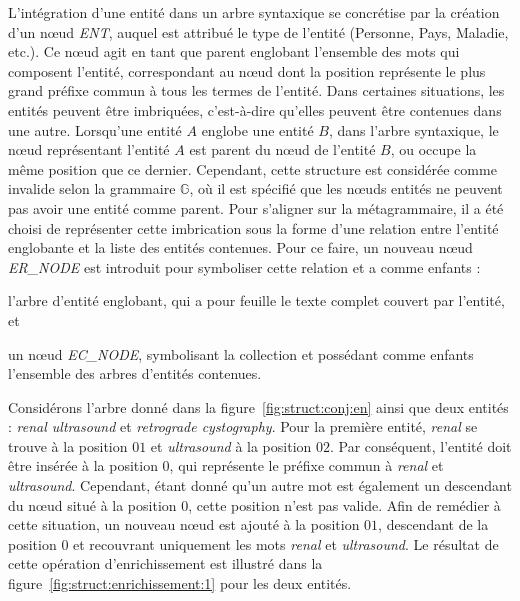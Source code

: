 L'intégration d'une entité dans un arbre syntaxique se concrétise par la création d'un nœud \emph{ENT}, auquel est attribué le type de l'entité (Personne, Pays, Maladie, etc.).
Ce nœud agit en tant que parent englobant l'ensemble des mots qui composent l'entité, correspondant au nœud dont la position représente le plus grand préfixe commun à tous les termes de l'entité.
Dans certaines situations, les entités peuvent être imbriquées, c'est-à-dire qu'elles peuvent être contenues dans une autre.
Lorsqu'une entité $A$ englobe une entité $B$, dans l'arbre syntaxique, le nœud représentant l'entité $A$ est parent du nœud de l'entité $B$, ou occupe la même position que ce dernier.
Cependant, cette structure est considérée comme invalide selon la grammaire $\mathbb{G}$, où il est spécifié que les nœuds entités ne peuvent pas avoir une entité comme parent.
Pour s'aligner sur la métagrammaire, il a été choisi de représenter cette imbrication sous la forme d'une relation entre l'entité englobante et la liste des entités contenues.
Pour ce faire, un nouveau nœud \emph{ER\_NODE} est introduit pour symboliser cette relation et a comme enfants :
\begin{enumerate*}[label=(\roman*)]
\item l'arbre d'entité englobant, qui a pour feuille le texte complet couvert par l'entité, et
\item un nœud \emph{EC\_NODE}, symbolisant la collection et possédant comme enfants l'ensemble des arbres d'entités contenues.
\end{enumerate*}

\begin{example}
    Considérons l'arbre donné dans la figure~\ref{fig:struct:conj:en} ainsi que deux entités : \emph{renal ultrasound} et \emph{retrograde cystography}.
    Pour la première entité, \emph{renal} se trouve à la position $01$ et \emph{ultrasound} à la position $02$.
    Par conséquent, l'entité doit être insérée à la position $0$, qui représente le préfixe commun à \emph{renal} et \emph{ultrasound}.
    Cependant, étant donné qu'un autre mot est également un descendant du nœud situé à la position $0$, cette position n'est pas valide.
    Afin de remédier à cette situation, un nouveau nœud est ajouté à la position $01$, descendant de la position $0$ et recouvrant uniquement les mots \emph{renal} et \emph{ultrasound}.
    Le résultat de cette opération d'enrichissement est illustré dans la figure~\ref{fig:struct:enrichissement:1} pour les deux entités.
\end{example}

